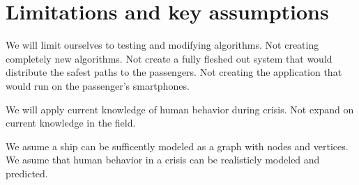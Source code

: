 \chapter{Limitations and key assumptions}
\label{ch:limitations}





We will limit ourselves to testing and modifying algorithms.
Not creating completely new algorithms.
Not create a fully fleshed out system that would distribute the
safest paths to the passengers.
Not creating the application that would run on the passenger's smartphones.

We will apply current knowledge of human behavior during crisis.
Not expand on current knowledge in the field.

We asume a ship can be sufficently modeled as a graph with nodes and vertices. 
We asume that human behavior in a crisis can be realisticly modeled and
predicted.
